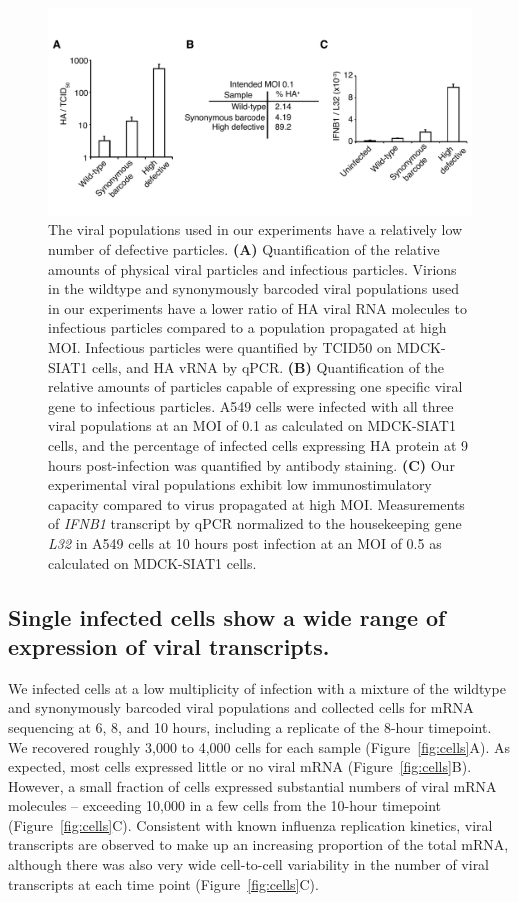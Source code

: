 \documentclass[9pt,lineno]{elife}
\begin{document}
\begin{figure}
\includegraphics[width=0.7\linewidth]{figures/Validating_barcode_virus/validating_populations_D02.pdf}
\caption{\label{fig:viruspopulations} The viral populations used in our experiments have a relatively low number of defective particles. 
{\bf (A)}
Quantification of the relative amounts of physical viral particles and infectious particles.
Virions in the wildtype and synonymously barcoded viral populations used in our experiments have a lower ratio of HA viral RNA molecules to infectious particles compared to a population propagated at high MOI.
Infectious particles were quantified by TCID50 on MDCK-SIAT1 cells, and HA vRNA by qPCR. 
{\bf (B)} 
Quantification of the relative amounts of particles capable of expressing one specific viral gene to infectious particles.
A549 cells were infected with all three viral populations at an MOI of 0.1 as calculated on MDCK-SIAT1 cells, and the percentage of infected cells expressing HA protein at 9 hours post-infection was quantified by antibody staining.
{\bf (C)} Our experimental viral populations exhibit low immunostimulatory capacity compared to virus propagated at high MOI. 
Measurements of \emph{IFNB1} transcript by qPCR normalized to the housekeeping gene \emph{L32} in A549 cells at 10 hours post infection at an MOI of 0.5 as calculated on MDCK-SIAT1 cells.}
\end{figure}

\subsection{Single infected cells show a wide range of expression of viral transcripts.}
We infected cells at a low multiplicity of infection with a mixture of the wildtype and synonymously barcoded viral populations and collected cells for mRNA sequencing at 6, 8, and 10 hours, including a replicate of the 8-hour timepoint.
We recovered roughly 3,000 to 4,000 cells for each sample (Figure~\ref{fig:cells}A). 
As expected, most cells expressed little or no viral mRNA (Figure~\ref{fig:cells}B).
However, a small fraction of cells expressed substantial numbers of viral mRNA molecules -- exceeding 10,000 in a few cells from the 10-hour timepoint (Figure~\ref{fig:cells}C). 
Consistent with known influenza replication kinetics, viral transcripts are observed to make up an increasing proportion of the total mRNA, although there was also very wide cell-to-cell variability in the number of viral transcripts at each time point (Figure~\ref{fig:cells}C).
\end{document}
